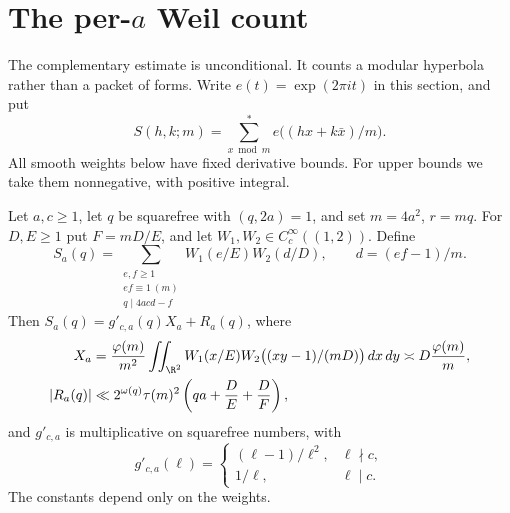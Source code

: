 \section{The per-$a$ Weil count}\label{sec:pera}
The complementary estimate is unconditional.  It counts a modular hyperbola
rather than a packet of forms.  Write $e(t)=\exp(2\pi it)$ in this section,
and put
\[
 S(h,k;m)=\sum_{x\bmod m}^{*}e\bigl((hx+k\bar x)/m\bigr).
\]
All smooth weights below have fixed derivative bounds.  For upper bounds
we take them nonnegative, with positive integral.

\begin{proposition}\label{L:7.1}
Let $a,c\geq1$, let $q$ be squarefree with $(q,2a)=1$, and set
$m=4a^2$, $r=mq$.  For $D,E\geq1$ put $F=mD/E$, and let
$W_1,W_2\in C_c^\infty((1,2))$.  Define
\[
 S_a(q)=\sum_{\substack{e,f\geq1\\ef\equiv1\ (m)\\q\mid4acd-f}}
 W_1(e/E)W_2(d/D),\qquad d=(ef-1)/m.
\]
Then $S_a(q)=g'_{c,a}(q)X_a+R_a(q)$, where
\begin{align}
 X_a&=\frac{\varphi(m)}{m^2}\iint_{\R^2}
 W_1(x/E)W_2\bigl((xy-1)/(mD)\bigr)\,dx\,dy
 \asymp D\frac{\varphi(m)}m,\label{C:eq:Ka-main}\\
 |R_a(q)|&\ll 2^{\omega(q)}\tau(m)^2
 \left(qa+\frac DE+\frac DF\right),\label{C:eq:Ka-error}
\end{align}
and $g'_{c,a}$ is multiplicative on squarefree numbers, with
\[
 g'_{c,a}(\ell)=
 \begin{cases}(\ell-1)/\ell^2,&\ell\nmid c,\\1/\ell,&\ell\mid c.
 \end{cases}
\]
The constants depend only on the weights.
\end{proposition}
